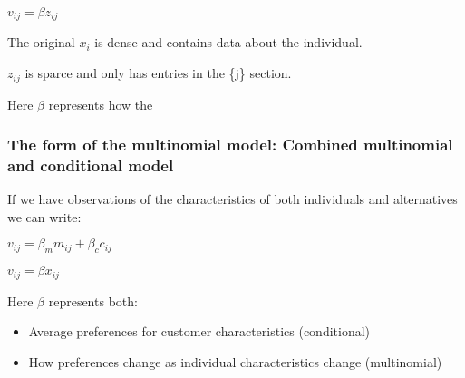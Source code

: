 \(v_{ij}=\beta z_{ij}\)

The original \(x_i\) is dense and contains data about the individual.

\(z_{ij}\) is sparce and only has entries in the \{j\} section.

Here \(\beta \) represents how the 

\subsubsection{The form of the multinomial model: Combined multinomial and conditional model}

If we have observations of the characteristics of both individuals and alternatives we can write:

\(v_{ij}=\beta_m m_{ij}+\beta_cc_{ij}\)

\(v_{ij}=\beta x_{ij}\)

Here \(\beta \) represents both:

\begin{itemize}
\item Average preferences for customer characteristics (conditional)
\item How preferences change as individual characteristics change (multinomial)
\end{itemize}


